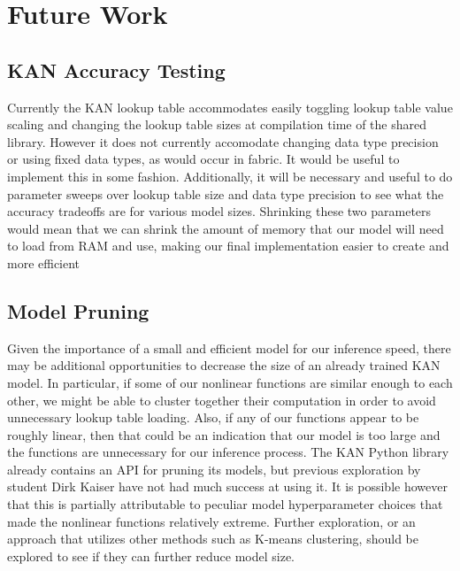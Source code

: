\documentclass[psamsfonts]{amsart}
\theoremstyle{definition}
\theoremstyle{remark}
\numberwithin{equation}{section}
\begin{document}
\section{Future Work}
\subsection{KAN Accuracy Testing}
Currently the KAN lookup table accommodates easily toggling lookup table value scaling and changing the lookup table sizes at compilation time of the shared library. However it does not currently accomodate changing data type precision or using fixed data types, as would occur in fabric. It would be useful to implement this in some fashion. Additionally, it will be necessary and useful to do parameter sweeps over lookup table size and data type precision to see what the accuracy tradeoffs are for various model sizes. Shrinking these two parameters would mean that we can shrink the amount of memory that our model will need to load from RAM and use, making our final implementation easier to create and more efficient

\subsection{Model Pruning}
Given the importance of a small and efficient model for our inference speed, there may be additional opportunities to decrease the size of an already trained KAN model. In particular, if some of our nonlinear functions are similar enough to each other, we might be able to cluster together their computation in order to avoid unnecessary lookup table loading. Also, if any of our functions appear to be roughly linear, then that could be an indication that our model is too large and the functions are unnecessary for our inference process. The KAN Python library already contains an API for pruning its models, but previous exploration by student Dirk Kaiser have not had much success at using it. It is possible however that this is partially attributable to peculiar model hyperparameter choices that made the nonlinear functions relatively extreme. Further exploration, or an approach that utilizes other methods such as K-means clustering, should be explored to see if they can further reduce model size.
\end{document}
